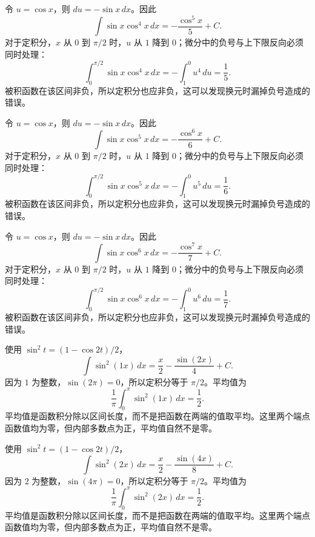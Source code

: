 \documentclass[UTF8,12pt,a4paper,fontset=fandol]{ctexart}
\begin{document}
\begin{solve}\label{ans:c14q4}
令 $u=\cos x$，则 $du=-\sin x\,dx$。因此
\[
\int\sin x\cos^{4}x\,dx=-\frac{\cos^{5}x}{5}+C.
\]
对于定积分，$x$ 从 $0$ 到 $\pi/2$ 时，$u$ 从 $1$ 降到 $0$；微分中的负号与上下限反向必须同时处理：
\[
\int_0^{\pi/2}\sin x\cos^{4}x\,dx=-\int_1^0u^{4}\,du=\frac{1}{5}.
\]
被积函数在该区间非负，所以定积分也应非负，这可以发现换元时漏掉负号造成的错误。
\end{solve}

\begin{solve}\label{ans:c14q5}
令 $u=\cos x$，则 $du=-\sin x\,dx$。因此
\[
\int\sin x\cos^{5}x\,dx=-\frac{\cos^{6}x}{6}+C.
\]
对于定积分，$x$ 从 $0$ 到 $\pi/2$ 时，$u$ 从 $1$ 降到 $0$；微分中的负号与上下限反向必须同时处理：
\[
\int_0^{\pi/2}\sin x\cos^{5}x\,dx=-\int_1^0u^{5}\,du=\frac{1}{6}.
\]
被积函数在该区间非负，所以定积分也应非负，这可以发现换元时漏掉负号造成的错误。
\end{solve}

\begin{solve}\label{ans:c14q6}
令 $u=\cos x$，则 $du=-\sin x\,dx$。因此
\[
\int\sin x\cos^{6}x\,dx=-\frac{\cos^{7}x}{7}+C.
\]
对于定积分，$x$ 从 $0$ 到 $\pi/2$ 时，$u$ 从 $1$ 降到 $0$；微分中的负号与上下限反向必须同时处理：
\[
\int_0^{\pi/2}\sin x\cos^{6}x\,dx=-\int_1^0u^{6}\,du=\frac{1}{7}.
\]
被积函数在该区间非负，所以定积分也应非负，这可以发现换元时漏掉负号造成的错误。
\end{solve}

\begin{solve}\label{ans:c14q7}
使用 $\sin^2t=(1-\cos2t)/2$，
\[
\int\sin^2(1x)\,dx=\frac x2-\frac{\sin(2x)}{4}+C.
\]
因为 $1$ 为整数，$\sin(2\pi)=0$，所以定积分等于 $\pi/2$。平均值为
\[
\frac1\pi\int_0^\pi\sin^2(1x)\,dx=\frac12.
\]
平均值是函数积分除以区间长度，而不是把函数在两端的值取平均。这里两个端点函数值均为零，但内部多数点为正，平均值自然不是零。
\end{solve}

\begin{solve}\label{ans:c14q8}
使用 $\sin^2t=(1-\cos2t)/2$，
\[
\int\sin^2(2x)\,dx=\frac x2-\frac{\sin(4x)}{8}+C.
\]
因为 $2$ 为整数，$\sin(4\pi)=0$，所以定积分等于 $\pi/2$。平均值为
\[
\frac1\pi\int_0^\pi\sin^2(2x)\,dx=\frac12.
\]
平均值是函数积分除以区间长度，而不是把函数在两端的值取平均。这里两个端点函数值均为零，但内部多数点为正，平均值自然不是零。
\end{solve}
\end{document}
